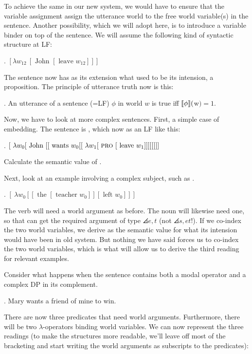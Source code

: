 To achieve the same in our new system, we would have to ensure that the variable assignment assign the utterance world to the free world variable(s) in the sentence. Another possibility, which we will adopt here, is to introduce a variable binder on top of the sentence. We will assume the following kind of syntactic structure at LF:

\ex. $[ \lambda w_{12}\ [ \mbox{ John } [ \mbox{ leave } w_{12} ]]]$

The sentence now has as its extension what used to be its intension, a proposition. The principle of utterance truth now is this:

\ex. An utterance of a sentence (=LF) $\phi$ in world $w$ is true iff $\llbracket \phi \rrbracket($w$) = 1$.

Now, we have to look at more complex sentences. First, a simple case of embedding. The sentence is , which now as an LF like this:

\ex. $[\ \lambda w_{0} [ \mbox{ John } [ [ \mbox{ wants } w_{0} [ [\ \lambda w_{1} [ \mbox{ \textsc{pro} } [ \mbox{ leave } w_{1} ]]]]]]]]$
 
\begin{exercise}
	Calculate the semantic value of \Last. \eex
\end{exercise}

Next, look at an example involving a complex subject, such as .

\ex. $[\ \lambda w_{0} [ [ \mbox{ the } [ \mbox{ teacher } w_{0} ]] [ \mbox{ left } w_{0} ]]]$

The verb will need a world argument as before. The noun  will likewise need one, so that  can get the required argument of type $\angles{e,t}$ (not $\angles{s,et}$!). If we co-index the two world variables, we derive as the semantic value for \Last what its intension would have been in old system. But nothing we have said forces us to co-index the two world variables, which is what will allow us to derive the third reading for relevant examples.

Consider what happens when the sentence contains both a modal operator and a complex DP in its complement.

\ex. \label{fom} Mary wants a friend of mine to win.

There are now three predicates that need world arguments. Furthermore, there will be two $\lambda$-operators binding world variables. We can now represent the three readings (to make the structures more readable, we'll leave off most of the bracketing and start writing the world arguments as subscripts to the predicates):


